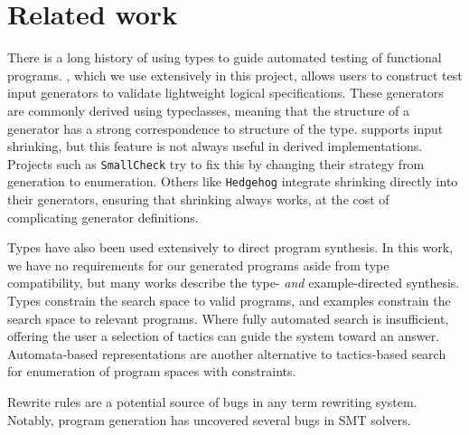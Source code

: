 \section{Related work}
\label{sec:related}

There is a long history of using types to guide automated testing of functional programs. \Quickcheck \cite{claessen2000quickcheck}, which we use extensively in this project, allows users to construct test input generators to validate lightweight logical specifications. These generators are commonly derived using typeclasses, meaning that the structure of a generator has a strong correspondence to structure of the type. \Quickcheck supports input shrinking, but this feature is not always useful in derived implementations. Projects such as \texttt{SmallCheck} \cite{runciman2008smallcheck} try to fix this by changing their strategy from generation to enumeration. Others like \texttt{Hedgehog} \cite{hedgehog} integrate shrinking directly into their generators, ensuring that shrinking always works, at the cost of complicating generator definitions.

Types have also been used extensively to direct program synthesis. In this work, we have no requirements for our generated programs aside from type compatibility, but many works describe the type- \textit{and} example-directed synthesis. \cite{osera2015type, feser2015synthesizing} Types constrain the search space to valid programs, and examples constrain the search space to relevant programs. Where fully automated search is insufficient, offering the user a selection of tactics can guide the system toward an answer. \cite{delahaye2000tactic} Automata-based representations \cite{koppel2022searching} are another alternative to tactics-based search for enumeration of program spaces with constraints.

Rewrite rules are a potential source of bugs in any term rewriting system. Notably, program generation has uncovered several bugs in SMT solvers. \cite{winterer2020validating}
